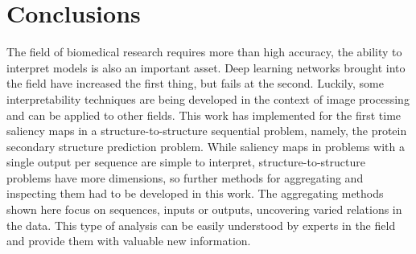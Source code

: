 \chapter{Conclusions} \label{Chapter: Conclusions}






The field of biomedical research requires more than high accuracy, the ability to interpret models is also an important asset. Deep learning networks brought into the field have increased the first thing, but fails at the second. Luckily, some interpretability techniques are being developed in the context of image processing and can be applied to other fields. This work has implemented for the first time saliency maps in a structure-to-structure sequential problem, namely, the protein secondary structure prediction problem. While saliency maps in problems with a single output per sequence are simple to interpret, structure-to-structure problems have more dimensions, so further methods for aggregating and inspecting them had to be developed in this work. The aggregating methods shown here focus on sequences, inputs or outputs, uncovering varied relations in the data. This type of analysis can be easily understood by experts in the field and provide them with valuable new information.

